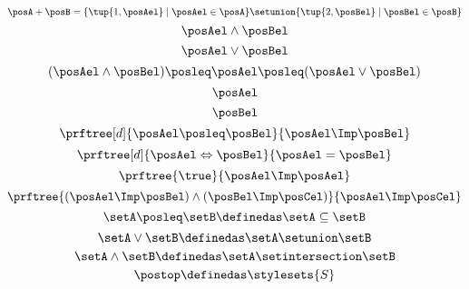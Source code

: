 {\begin{forslides}
\begin{equation*}
			\label{eq:set_disj}
			\posA+\posB=\{ \tup{1,\posAel} \mid \posAel\in \posA \}\setunion \{\tup{2,\posBel}\mid \posBel \in \posB\}
		\end{equation*}
		\begin{equation*}
			\label{eq:latt_1}
			\posAel \wedge \posBel
		\end{equation*}
		\begin{equation*}
			\label{eq:latt_2}
			\posAel \vee \posBel
		\end{equation*}
		\begin{equation*}
			\label{eq:latt_3}
			(\posAel \wedge \posBel)\posleq \posAel \posleq (\posAel \vee \posBel)
		\end{equation*}
		\begin{equation*}
			\label{eq:latt_4}
			\posAel
		\end{equation*}
		\begin{equation*}
			\label{eq:latt_5}
			\posBel
		\end{equation*}
		\begin{equation*}
			\label{eq:prop_1}
			\prftree[d]{\posAel \posleq \posBel}{\posAel \Imp \posBel}
		\end{equation*}
		\begin{equation*}
			\label{eq:prop_2}
			\prftree[d]{\posAel \Leftrightarrow \posBel}{\posAel = \posBel}
		\end{equation*}
		\begin{equation*}
			\label{eq:prop_3}
			\prftree{\true}{\posAel \Imp \posAel}
		\end{equation*}
		\begin{equation*}
			\label{eq:prop_4}
			\prftree{(\posAel \Imp \posBel)\wedge (\posBel \Imp \posCel)}{\posAel \Imp \posCel}
		\end{equation*}
		\begin{equation*}
			\label{eq:pow_1}
			\setA \posleq \setB \definedas \setA \subseteq \setB
		\end{equation*}
		\begin{equation*}
			\label{eq:pow_2}
			\setA \vee \setB \definedas \setA \setunion \setB
		\end{equation*}
		\begin{equation*}
			\label{eq:pow_3}
			\setA \wedge \setB \definedas \setA \setintersection \setB
		\end{equation*}
		\begin{equation*}
			\label{eq:pow_4}
			\postop \definedas \stylesets{S}
		\end{equation*}

\end{forslides}}
